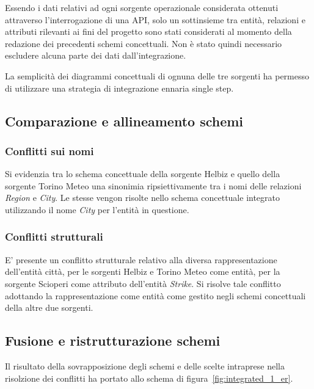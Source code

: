 Essendo i dati relativi ad ogni sorgente operazionale considerata ottenuti
attraverso l'interrogazione di una API, solo un sottinsieme tra entità,
relazioni e attributi rilevanti ai fini del progetto sono stati considerati
al momento della redazione dei precedenti schemi concettuali. Non è stato
quindi necessario escludere alcuna parte dei dati dall'integrazione. 

La semplicità dei diagrammi concettuali di ognuna delle tre sorgenti ha
permesso di utilizzare una strategia di integrazione ennaria single step.

\subsection{Comparazione e allineamento schemi}

\subsubsection{Conflitti sui nomi}

Si evidenzia tra lo schema concettuale della sorgente Helbiz e quello della
sorgente Torino Meteo una sinonimia ripsiettivamente tra i nomi delle
relazioni \textit{Region} e \textit{City}. Le stesse vengon risolte nello
schema concettuale integrato utilizzando il nome \textit{City} per l'entità
in questione.

\subsubsection{Conflitti strutturali}
E' presente un conflitto strutturale relativo alla diversa rappresentazione 
dell'entità città, per le sorgenti Helbiz e Torino Meteo come entità,
per la sorgente Scioperi come attributo dell'entità \textit{Strike}.
Si risolve tale conflitto adottando la rappresentazione come entità
come gestito negli schemi concettuali della altre due sorgenti.

\subsection{Fusione e ristrutturazione schemi}

Il risultato della sovrapposizione degli schemi e delle scelte intraprese nella
risolzione dei conflitti ha portato allo schema di figura~\ref{fig:integrated_1_er}.

